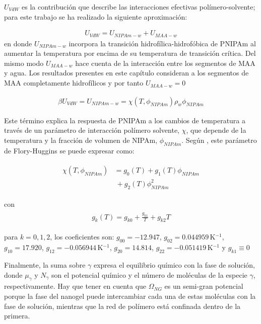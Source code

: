 	
	
	$U_{VdW}$ es la contribuci\'on que describe las interacciones efectivas pol\'imero-solvente; para este trabajo  se ha realizado la siguiente aproximaci\'on: 
	
	\begin{align}
		U_{VdW} = U_{NIPAm-w} + U_{MAA-w}
	\end{align}
	\noindent en donde $U_{NIPAm-w}$ incorpora la transici\'on hidrof\'ilica-hidrof\'obica de PNIPAm al aumentar la temperatura por encima de su temperatura de transici\'on cr\'itica. 
	Del mismo modo $U_{MAA-w}$ hace cuenta de la interacci\'on entre los segmentos de MAA y agua.
	Los resultados presentes en este cap\'itulo consideran a los segmentos de MAA completamente hidrof\'ilicos y por tanto $U_{MAA-w} = 0$
	
	\begin{align}
		\beta U_{VdW} = U_{NIPAm-w} = \chi (T, \phi_{NIPAm})\rho_w \phi_{NIPAm}
	\end{align}
	
	
	Este  t\'ermino explica la respuesta de PNIPAm a los cambios de temperatura a trav\'es de un par\'ametro de interacci\'on pol\'imero solvente, $\chi$, que depende de la temperatura y la fracci\'on de volumen de NIPAm, $\phi_{NIPAm}$.
	Seg\'un  \citet{afroze2000}, este par\'ametro de Flory-Huggins se puede expresar como:
	
	
	\begin{align}
		\begin{aligned}
			\chi (T, \phi_{NIPAm}) &=g_0(T) +g_1(T)\phi_{NIPAm} \\
			&~+ g_2(T)\phi_{NIPAm}^2
		\end{aligned}
	\end{align}
	
	\noindent con
	\begin{align}
		\begin{aligned} 
			g_k(T)=g_{k0} + \frac{g_{k1}}{T} + g_{k2}T
		\end{aligned}
	\end{align}
	
	
	\noindent para  $k=0,1,2$, los coeficientes son: $g_{00}= -12.947$, $g_{02}=0.044959\,$K$^{-1}$, $g_{10}= 17.920$, $g_{12}= -0.056944$\,K$^{-1}$, $g_{20}= 14.814$, $g_{22}= -0.051419$\,K$^{-1}$  y $g_{k1}\equiv 0$ \cite{afroze2000}
	
	
	
	
	Finalmente, la suma sobre  $\gamma$ expresa el equilibrio qu\'imico con la fase de soluci\'on, donde $\mu_\gamma$ y $N_\gamma$ son el potencial qu\'imico y el n\'umero de mol\'eculas de la especie $\gamma$, respectivamente.
	Hay que tener en cuenta que $\Omega_{NG}$ es un semi-gran potencial porque la fase del nanogel puede intercambiar cada una de estas mol\'eculas con la fase de soluci\'on, mientras que la red de pol\'imero est\'a confinada dentro de la primera.
	
